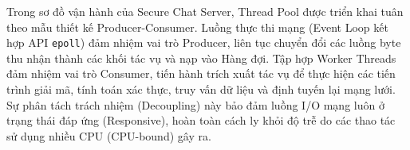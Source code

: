 Trong sơ đồ vận hành của Secure Chat Server, Thread Pool được triển khai tuân theo mẫu thiết kế Producer-Consumer. Luồng thực thi mạng (Event Loop kết hợp API \texttt{epoll}) đảm nhiệm vai trò Producer, liên tục chuyển đổi các luồng byte thu nhận thành các khối tác vụ và nạp vào Hàng đợi. Tập hợp Worker Threads đảm nhiệm vai trò Consumer, tiến hành trích xuất tác vụ để thực hiện các tiến trình giải mã, tính toán xác thực, truy vấn dữ liệu và định tuyến lại mạng lưới. Sự phân tách trách nhiệm (Decoupling) này bảo đảm luồng I/O mạng luôn ở trạng thái đáp ứng (Responsive), hoàn toàn cách ly khỏi độ trễ do các thao tác sử dụng nhiều CPU (CPU-bound) gây ra.
